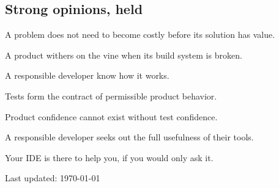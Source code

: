 \documentclass[10pt,letterpaper]{article}
\newcommand\ttt\texttt
\renewenvironment{itemize}{
  \begin{list}{}{
    \setlength{\leftmargin}{1.5em}
    \setlength{\itemsep}{0.25em}
    \setlength{\parskip}{0pt}
    \setlength{\parsep}{0.25em}
  }
}{
  \end{list}
}
\begin{document}
\newcommand{\opinionsPar}{\par\vspace{-.3em}\quad}

\subsection*{Strong opinions, held}
\begin{itemize}
  \item A problem does not need to become costly before its solution has value.
  \item A product withers on the vine when its build system is broken.\opinionsPar
    A responsible developer know how it works.
  \item Tests form the contract of permissible product behavior.\opinionsPar
    Product confidence cannot exist without test confidence.
  \item A responsible developer seeks out the full usefulness of their tools.\opinionsPar
    Your IDE is there to help you, if you would only ask it.
\end{itemize}

%

\vfill
\begin{center}
  \begin{small}
    Last updated: \today
  \end{small}
\end{center}
\end{document}
